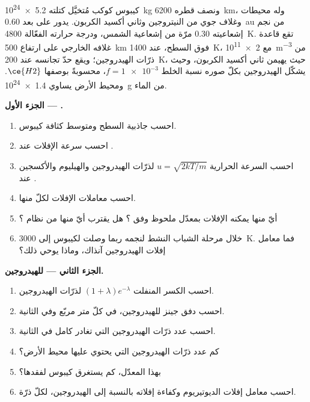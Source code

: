 \begin{problem}
\label{pb:b3:planetary-atmospheres:1}
كيبوس كوكب مُتخيَّل كتلته \qty{5.2e24}{kg} ونصف قطره
\qty{6200}{km}، وله محيطات وغلاف جوي من النيتروجين وثاني
أكسيد الكربون. يدور على بعد \qty{0.60}{au} من نجم إشعاعيته 0.30 مرّة من إشعاعية
الشمس، ودرجة حرارته الفعّالة \qty{4800}{K}. تقع قاعدة غلافه الخارجي
على ارتفاع \qty{500}{km} فوق السطح، عند \qty{1400}{K}، مع
\qty{2e11}{m^{-3}} من ذرّات الهيدروجين؛ ويقع حدّ تجانسه عند \qty{200}{K}،
حيث يهيمن ثاني أكسيد الكربون، وحيث يشكّل الهيدروجين بكلّ صوره
نسبة الخلط $f = \num{1e-3}$، محسوبةً بوصفها $\ce{H2}$. ومحيط الأرض يساوي
\qty{1.4e24}{g} من الماء.

\medskip\noindent\textbf{الجزء الأول --- .}
\begin{enumerate}
\item احسب جاذبية السطح ومتوسط كثافة كيبوس.
\item احسب سرعة الإفلات عند .
\item احسب السرعة الحرارية $u = \sqrt{2kT/m}$ لذرّات الهيدروجين والهيليوم
  والأكسجين عند .
\item احسب معاملات الإفلات لكلّ منها.
\item أيّ منها يمكنه الإفلات بمعدّل ملحوظ وفق ؟
  هل يقترب أيّ منها من نظام ؟
\item خلال مرحلة الشباب النشط لنجمه ربما وصلت  لكيبوس
  إلى \qty{3000}{K}. فما معامل إفلات الهيدروجين آنذاك،
  وماذا يوحي ذلك؟
\end{enumerate}

\medskip\noindent\textbf{الجزء الثاني ---  للهيدروجين.}
\begin{enumerate}[resume]
\item احسب الكسر المنفلت $(1 + \lambda)e^{-\lambda}$ لذرّات
  الهيدروجين.
\item احسب دفق جينز للهيدروجين، في كلّ متر مربّع وفي الثانية.
\item احسب عدد ذرّات الهيدروجين التي تغادر كامل 
  في الثانية.
\item كم عدد ذرّات الهيدروجين التي يحتوي عليها محيط الأرض؟
\item بهذا المعدّل، كم يستغرق كيبوس لفقدها؟
\item احسب معامل إفلات الديوتيريوم وكفاءة إفلاته
  بالنسبة إلى الهيدروجين، لكلّ ذرّة.
\end{enumerate}


\end{problem}
